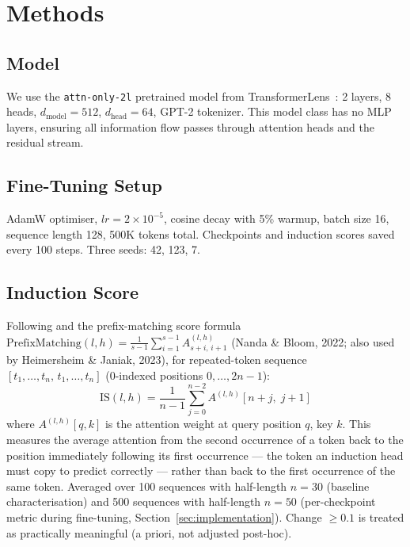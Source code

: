 \section{Methods}
\label{sec:methods}

\subsection{Model}
We use the \texttt{attn-only-2l} pretrained model from
TransformerLens~\citep{nanda2022transformerlens}: 2 layers, 8 heads,
$d_\text{model}=512$, $d_\text{head}=64$, GPT-2 tokenizer.
This model class has no MLP layers, ensuring all information flow passes through
attention heads and the residual stream.

\subsection{Fine-Tuning Setup}
AdamW optimiser, $lr=2\times10^{-5}$, cosine decay with 5\% warmup,
batch size 16, sequence length 128, 500K tokens total.
Checkpoints and induction scores saved every 100 steps.
Three seeds: 42, 123, 7.

\subsection{Induction Score}
Following \citet{olsson2022context} and the prefix-matching score formula
$\text{PrefixMatching}(l,h) = \frac{1}{s-1}\sum_{i=1}^{s-1} A_{s+i,\,i+1}^{(l,h)}$
(Nanda \& Bloom, 2022; also used by Heimersheim \& Janiak, 2023), for
repeated-token sequence $[t_1,\ldots,t_n,\,t_1,\ldots,t_n]$
(0-indexed positions $0,\ldots,2n-1$):
\begin{equation}
  \text{IS}(l,h) = \frac{1}{n-1}\sum_{j=0}^{n-2} A^{(l,h)}[n+j,\;j+1]
  \label{eq:is}
\end{equation}
where $A^{(l,h)}[q,k]$ is the attention weight at query position $q$, key
$k$. This measures the average attention from the second occurrence of a
token back to the position immediately following its first occurrence ---
the token an induction head must copy to predict correctly --- rather than
back to the first occurrence of the same token. Averaged over 100 sequences
with half-length $n=30$ (baseline characterisation) and 500 sequences with
half-length $n=50$ (per-checkpoint metric during fine-tuning,
Section~\ref{sec:implementation}).
Change $\geq 0.1$ is treated as practically meaningful (a priori, not adjusted post-hoc).

